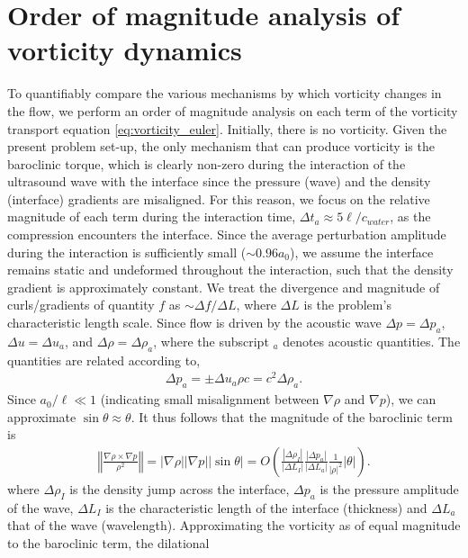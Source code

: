 \documentclass{jfm}%
\newcommand{\orderof}[1]{\ensuremath{\textit{O}\left(#1\right)}}
\newcommand{\abs}[1]{\ensuremath{\left|#1\right|}}
\newcommand{\norm}[1]{\ensuremath{\left\Vert#1\right\Vert}}
\begin{document}
\section{Order of magnitude analysis of vorticity dynamics}
\label{sec:oom_analysis}
To quantifiably compare the various mechanisms by which vorticity
changes in the flow, we perform an order of magnitude analysis on each
term of the vorticity transport equation
\eqref{eq:vorticity_euler}. Initially, there is no vorticity. Given
the present problem set-up, the only mechanism that can produce
vorticity is the baroclinic torque, which is clearly non-zero during
the interaction of the ultrasound wave with the interface since the
pressure (wave) and the density (interface) gradients are
misaligned. For this reason, we focus on the relative magnitude of
each term during the interaction time,
$\Delta t_a \approx 5\ell/c_{water}$, as the compression encounters
the interface. Since the average perturbation amplitude during the
interaction is sufficiently small ($\sim 0.96a_0$), we assume the
interface remains static and undeformed throughout the interaction,
such that the density gradient is approximately constant. We treat the
divergence and magnitude of curls/gradients of quantity $f$ as
$\sim \Delta f/ \Delta L$, where $\Delta L$ is the problem's
characteristic length scale. Since flow is driven by the acoustic wave
$\Delta p=\Delta p_a$, $\Delta u=\Delta u_a$, and
$\Delta \rho=\Delta \rho_a$, where the subscript $_a$ denotes acoustic
quantities. The quantities are related according to,
\begin{align}%
  \label{eq:acoustic_relations}%
  \Delta p_a=\pm\Delta u_a \rho c=c^2\Delta \rho_a.%
\end{align}
Since $a_0/\ell\ll 1$ (indicating small misalignment between
$\nabla \rho$ and $\nabla p$), we can approximate
$\sin \theta \approx \theta$. It thus follows that the magnitude of the
baroclinic term is
\begin{align}
  \label{eq:baroclinic_vorticity}%
  \norm{\frac{\nabla\rho\times\nabla p}{\rho^2}} =%
  |\nabla \rho||\nabla p||\sin\theta|=
  \orderof{\frac{\abs{\Delta \rho_I}}{\abs{\Delta L_I}}\frac{\abs{\Delta p_a}}{\abs{\Delta L_a}}\frac{1}{\abs{\rho}^2}\abs{\theta}}.%
\end{align}
where $\Delta \rho_I$ is the density jump across the interface,
$\Delta p_a$ is the pressure amplitude of the wave, $\Delta L_I$ is
the characteristic length of the interface (thickness) and
$\Delta L_a$ that of the wave (wavelength). Approximating the
vorticity as of equal magnitude to the baroclinic term, the dilational
\end{document}
